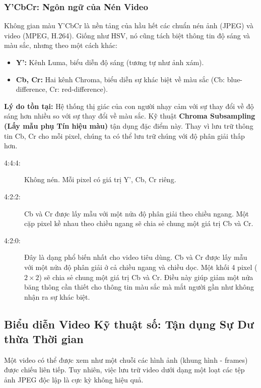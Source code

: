 \subsubsection{Y'CbCr: Ngôn ngữ của Nén Video}
\label{subsubsec:ycbcr_colorspace}
Không gian màu Y'CbCr là nền tảng của hầu hết các chuẩn nén ảnh (JPEG) và video (MPEG, H.264). Giống như HSV, nó cũng tách biệt thông tin độ sáng và màu sắc, nhưng theo một cách khác:
\begin{itemize}
    \item \textbf{Y':} Kênh Luma, biểu diễn độ sáng (tương tự như ảnh xám).
    \item \textbf{Cb, Cr:} Hai kênh Chroma, biểu diễn sự khác biệt về màu sắc (Cb: blue-difference, Cr: red-difference).
\end{itemize}
\textbf{Lý do tồn tại:} Hệ thống thị giác của con người nhạy cảm với sự thay đổi về độ sáng hơn nhiều so với sự thay đổi về màu sắc. Kỹ thuật \textbf{Chroma Subsampling (Lấy mẫu phụ Tín hiệu màu)} tận dụng đặc điểm này. Thay vì lưu trữ thông tin Cb, Cr cho mỗi pixel, chúng ta có thể lưu trữ chúng với độ phân giải thấp hơn.
\begin{description}
    \item[4:4:4:] Không nén. Mỗi pixel có giá trị Y', Cb, Cr riêng.
    \item[4:2:2:] Cb và Cr được lấy mẫu với một nửa độ phân giải theo chiều ngang. Một cặp pixel kề nhau theo chiều ngang sẽ chia sẻ chung một giá trị Cb và Cr.
    \item[4:2:0:] Đây là dạng phổ biến nhất cho video tiêu dùng. Cb và Cr được lấy mẫu với một nửa độ phân giải ở cả chiều ngang và chiều dọc. Một khối 4 pixel ($2 \times 2$) sẽ chia sẻ chung một giá trị Cb và Cr. Điều này giúp giảm một nửa băng thông cần thiết cho thông tin màu sắc mà mắt người gần như không nhận ra sự khác biệt.
\end{description}

\subsection{Biểu diễn Video Kỹ thuật số: Tận dụng Sự Dư thừa Thời gian}
\label{subsec:digital_video_representation}

Một video có thể được xem như một chuỗi các hình ảnh (khung hình - frames) được chiếu liên tiếp. Tuy nhiên, việc lưu trữ video dưới dạng một loạt các tệp ảnh JPEG độc lập là cực kỳ không hiệu quả.

